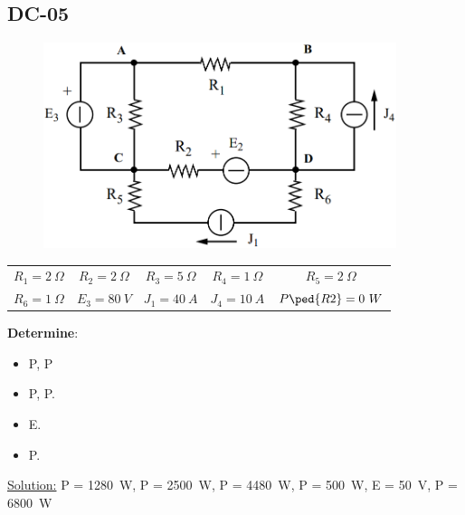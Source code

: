 \subsection{DC-05}
\begin{figure}[h]
\includegraphics[height=6cm]{img/1/05.png}
\centering
\end{figure}
\begin{center}
\begin{tabular}{ c c c c c}
  $R_1 = 2 \ \Omega$ & $R_2 = 2 \ \Omega$ & $R_3 = 5 \ \Omega$ & $R_4 = 1 \ \Omega$ & $R_5 = 2 \ \Omega$\\
  $R_6 = 1\ \Omega$ & $E_3 = 80\ V$ & $J_1 = 40 \ A$& $J_4 = 10 \ A$& $P\ped{R2} = 0 \ W$  \\
\end{tabular}
\end{center}
\newpage
\textbf{Determine}:
\begin{itemize}
  \item P, P
  \item P, P.
  \item E. 
  \item P. 
\end{itemize}
\underline{\large{Solution:}}
\newline
P = 1280\ W, P = 2500\ W, P = 4480\ W, P = 500\ W, E = 50\ V, P = 6800\ W
